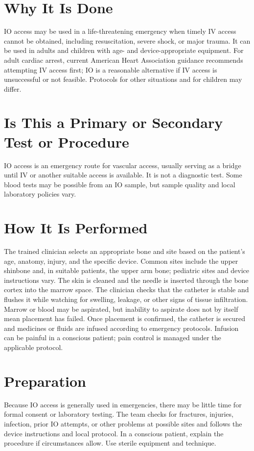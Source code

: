 \section*{Why It Is Done}
IO access may be used in a life-threatening emergency when timely IV access cannot be obtained, including resuscitation, severe shock, or major trauma. It can be used in adults and children with age- and device-appropriate equipment. For adult cardiac arrest, current American Heart Association guidance recommends attempting IV access first; IO is a reasonable alternative if IV access is unsuccessful or not feasible. Protocols for other situations and for children may differ.

\section*{Is This a Primary or Secondary Test or Procedure}
IO access is an emergency route for vascular access, usually serving as a bridge until IV or another suitable access is available. It is not a diagnostic test. Some blood tests may be possible from an IO sample, but sample quality and local laboratory policies vary.

\section*{How It Is Performed}
The trained clinician selects an appropriate bone and site based on the patient's age, anatomy, injury, and the specific device. Common sites include the upper shinbone and, in suitable patients, the upper arm bone; pediatric sites and device instructions vary. The skin is cleaned and the needle is inserted through the bone cortex into the marrow space. The clinician checks that the catheter is stable and flushes it while watching for swelling, leakage, or other signs of tissue infiltration. Marrow or blood may be aspirated, but inability to aspirate does not by itself mean placement has failed. Once placement is confirmed, the catheter is secured and medicines or fluids are infused according to emergency protocols. Infusion can be painful in a conscious patient; pain control is managed under the applicable protocol.

\section*{Preparation}
Because IO access is generally used in emergencies, there may be little time for formal consent or laboratory testing. The team checks for fractures, injuries, infection, prior IO attempts, or other problems at possible sites and follows the device instructions and local protocol. In a conscious patient, explain the procedure if circumstances allow. Use sterile equipment and technique.

